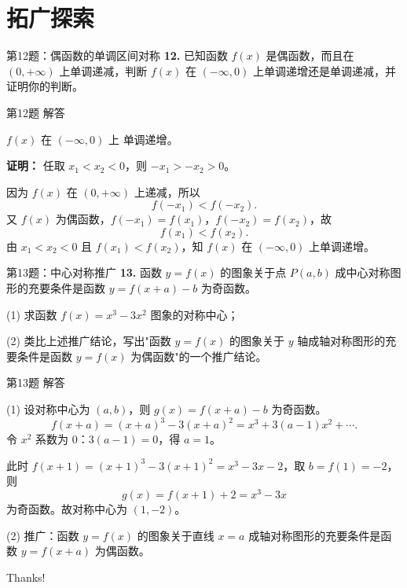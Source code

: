 \documentclass[10pt,aspectratio=169,serif,fleqn]{beamer}
\begin{document}
\section{拓广探索}
\begin{frame}[t]{第12题：偶函数的单调区间对称}
\textbf{12.} 已知函数 $f(x)$ 是偶函数，而且在 $(0,+\infty)$ 上单调递减，判断 $f(x)$ 在 $(-\infty,0)$ 上单调递增还是单调递减，并证明你的判断。
\end{frame}

\begin{frame}[t]{第12题 解答}
\begin{tcolorbox}[colback=orange!10,colframe=orange,title=\textbf{解}]
$f(x)$ 在 $(-\infty,0)$ 上 \alert{单调递增}。

\vspace{0.5em}
\textbf{证明：} 任取 $x_1<x_2<0$，则 $-x_1>-x_2>0$。

\vspace{0.3em}
因为 $f(x)$ 在 $(0,+\infty)$ 上递减，所以
\[
f(-x_1)<f(-x_2).
\]
又 $f(x)$ 为偶函数，$f(-x_1)=f(x_1)$，$f(-x_2)=f(x_2)$，故
\[
f(x_1)<f(x_2).
\]
由 $x_1<x_2<0$ 且 $f(x_1)<f(x_2)$，知 $f(x)$ 在 $(-\infty,0)$ 上单调递增。
\end{tcolorbox}
\end{frame}

\begin{frame}[t]{第13题：中心对称推广}
\textbf{13.} 函数 $y=f(x)$ 的图象关于点 $P(a,b)$ 成中心对称图形的充要条件是函数 $y=f(x+a)-b$ 为奇函数。

(1) 求函数 $f(x)=x^3-3x^2$ 图象的对称中心；

(2) 类比上述推广结论，写出"函数 $y=f(x)$ 的图象关于 $y$ 轴成轴对称图形的充要条件是函数 $y=f(x)$ 为偶函数"的一个推广结论。
\end{frame}

\begin{frame}[t]{第13题 解答}\vspace{-1em}
\begin{tcolorbox}[colback=orange!10,colframe=orange,title=\textbf{解}]
(1) 设对称中心为 $(a,b)$，则 $g(x)=f(x+a)-b$ 为奇函数。
\[
f(x+a)=(x+a)^3-3(x+a)^2=x^3+3(a-1)x^2+\cdots.
\]
令 $x^2$ 系数为 $0$：$3(a-1)=0$，得 $a=1$。

\vspace{0.3em}
此时 $f(x+1)=(x+1)^3-3(x+1)^2=x^3-3x-2$，取 $b=f(1)=-2$，则
\[
g(x)=f(x+1)+2=x^3-3x
\]
为奇函数。故对称中心为 $(1,-2)$。

\vspace{0.8em}
(2) 推广：函数 $y=f(x)$ 的图象关于直线 $x=a$ 成轴对称图形的充要条件是函数 $y=f(x+a)$ 为偶函数。
\end{tcolorbox}
\end{frame}

\begin{frame}[c]
  \begin{center}
    {\Huge\calligra Thanks!}
  \end{center}
\end{frame}
\end{document}
